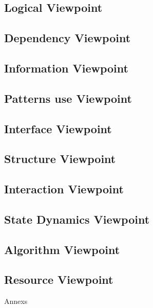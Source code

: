 \documentclass{article}
\begin{document}
\subsection{Logical Viewpoint}
\subsection{Dependency Viewpoint}
\subsection{Information Viewpoint}
\subsection{Patterns use Viewpoint}
\subsection{Interface Viewpoint}
\subsection{Structure Viewpoint}
\subsection{Interaction Viewpoint}
\subsection{State Dynamics Viewpoint}
\subsection{Algorithm Viewpoint}
\subsection{Resource Viewpoint}

Annexs
\end{document}
